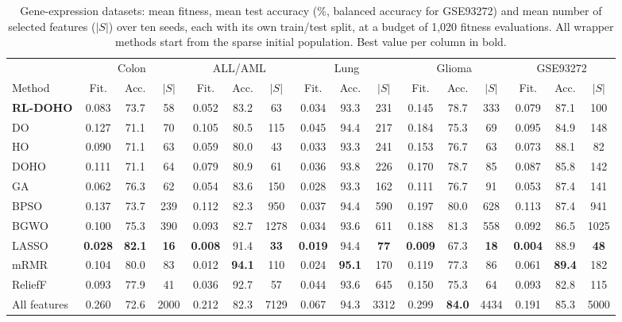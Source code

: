 \documentclass[pdflatex,sn-basic]{sn-jnl}
\begin{document}
\begin{table}[t]
\centering
\caption{Gene-expression datasets: mean fitness, mean test accuracy (\%, balanced accuracy for GSE93272) and mean number of selected features ($|S|$) over ten seeds, each with its own train/test split, at a budget of 1,020 fitness evaluations. All wrapper methods start from the sparse initial population. Best value per column in bold.}
\label{tab:genes}
\footnotesize
\setlength{\tabcolsep}{3.2pt}
\begin{tabular}{@{}l ccc ccc ccc ccc ccc@{}}
\toprule
& \multicolumn{3}{c}{Colon} & \multicolumn{3}{c}{ALL/AML} & \multicolumn{3}{c}{Lung} & \multicolumn{3}{c}{Glioma} & \multicolumn{3}{c}{GSE93272} \\
\cmidrule(lr){2-4}\cmidrule(lr){5-7}\cmidrule(lr){8-10}\cmidrule(lr){11-13}\cmidrule(l){14-16}
Method & Fit. & Acc. & $|S|$ & Fit. & Acc. & $|S|$ & Fit. & Acc. & $|S|$ & Fit. & Acc. & $|S|$ & Fit. & Acc. & $|S|$ \\
\midrule
\textbf{RL-DOHO} & 0.083 & 73.7 & 58 & 0.052 & 83.2 & 63 & 0.034 & 93.3 & 231 & 0.145 & 78.7 & 333 & 0.079 & 87.1 & 100 \\
DO & 0.127 & 71.1 & 70 & 0.105 & 80.5 & 115 & 0.045 & 94.4 & 217 & 0.184 & 75.3 & 69 & 0.095 & 84.9 & 148 \\
HO & 0.090 & 71.1 & 63 & 0.059 & 80.0 & 43 & 0.033 & 93.3 & 241 & 0.153 & 76.7 & 63 & 0.073 & 88.1 & 82 \\
DOHO & 0.111 & 71.1 & 64 & 0.079 & 80.9 & 61 & 0.036 & 93.8 & 226 & 0.170 & 78.7 & 85 & 0.087 & 85.8 & 142 \\
\midrule
GA & 0.062 & 76.3 & 62 & 0.054 & 83.6 & 150 & 0.028 & 93.3 & 162 & 0.111 & 76.7 & 91 & 0.053 & 87.4 & 141 \\
BPSO & 0.137 & 73.7 & 239 & 0.112 & 82.3 & 950 & 0.037 & 94.4 & 590 & 0.197 & 80.0 & 628 & 0.113 & 87.4 & 941 \\
BGWO & 0.100 & 75.3 & 390 & 0.093 & 82.7 & 1278 & 0.034 & 93.6 & 611 & 0.188 & 81.3 & 558 & 0.092 & 86.5 & 1025 \\
\midrule
LASSO & \textbf{0.028} & \textbf{82.1} & \textbf{16} & \textbf{0.008} & 91.4 & \textbf{33} & \textbf{0.019} & 94.4 & \textbf{77} & \textbf{0.009} & 67.3 & \textbf{18} & \textbf{0.004} & 88.9 & \textbf{48} \\
mRMR & 0.104 & 80.0 & 83 & 0.012 & \textbf{94.1} & 110 & 0.024 & \textbf{95.1} & 170 & 0.119 & 77.3 & 86 & 0.061 & \textbf{89.4} & 182 \\
ReliefF & 0.093 & 77.9 & 41 & 0.036 & 92.7 & 57 & 0.044 & 93.6 & 645 & 0.150 & 75.3 & 64 & 0.093 & 82.8 & 115 \\
All features & 0.260 & 72.6 & 2000 & 0.212 & 82.3 & 7129 & 0.067 & 94.3 & 3312 & 0.299 & \textbf{84.0} & 4434 & 0.191 & 85.3 & 5000 \\
\bottomrule
\end{tabular}
\end{table}
\end{document}
